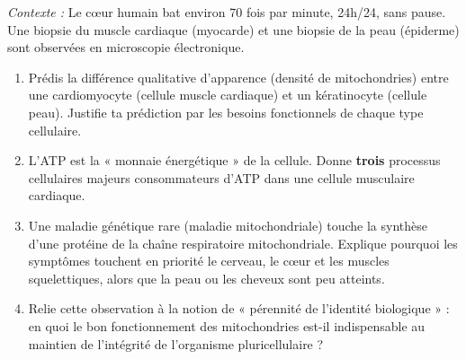 \documentclass[11pt]{article}
\begin{document}
\begin{exercice}
\textit{Contexte :} Le cœur humain bat environ 70 fois par minute, 24h/24, sans pause. Une biopsie du muscle cardiaque (myocarde) et une biopsie de la peau (épiderme) sont observées en microscopie électronique.
\begin{enumerate}
    \item Prédis la différence qualitative d'apparence (densité de mitochondries) entre une cardiomyocyte (cellule muscle cardiaque) et un kératinocyte (cellule peau). Justifie ta prédiction par les besoins fonctionnels de chaque type cellulaire.
    \item L'ATP est la « monnaie énergétique » de la cellule. Donne \textbf{trois} processus cellulaires majeurs consommateurs d'ATP dans une cellule musculaire cardiaque.
    \item Une maladie génétique rare (maladie mitochondriale) touche la synthèse d'une protéine de la chaîne respiratoire mitochondriale. Explique pourquoi les symptômes touchent en priorité le cerveau, le cœur et les muscles squelettiques, alors que la peau ou les cheveux sont peu atteints.
    \item Relie cette observation à la notion de « pérennité de l'identité biologique » : en quoi le bon fonctionnement des mitochondries est-il indispensable au maintien de l'intégrité de l'organisme pluricellulaire ?
\end{enumerate}
\end{exercice}
\end{document}
